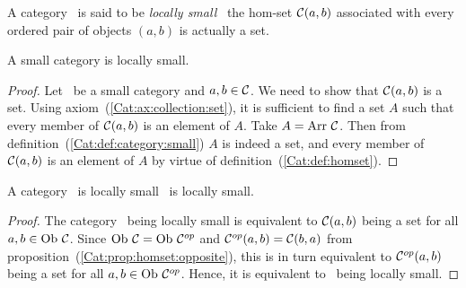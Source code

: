\begin{defin}\label{Cat:def:locally:small}
    A category \Cat\ is said to be {\em locally small} \ifand\ the hom-set
    $\mbox{$\cal C$}(a,b)$ associated with every ordered pair of objects $(a,b)$ is 
    actually a set.
\end{defin}

\begin{prop}\label{Cat:prop:small:locally:small}
    A small category is locally small.
\end{prop}
\begin{proof}
   Let \Cat\ be a small category and $a,b\in\mbox{$\cal C$}$. We need to show 
    that $\mbox{$\cal C$}(a,b)$ is a set. Using axiom~(\ref{Cat:ax:collection:set}),
    it is sufficient to find a set $A$ such that every member of
    $\mbox{$\cal C$}(a,b)$ is an element of $A$. Take $A=\mbox{\rm Arr}\ \mbox{$\cal C$}$. Then
    from definition~(\ref{Cat:def:category:small}) $A$ is indeed a set,
    and every member of $\mbox{$\cal C$}(a,b)$ is an element of $A$ by 
    virtue of definition~(\ref{Cat:def:homset}).
\end{proof}

\begin{prop}\label{Cat:prop:locally:small:opposite}
    A category \Cat\ is locally small \ifand\ \Cop is locally small.
\end{prop}
\begin{proof}
    The category \Cat\ being locally small is equivalent to $\mbox{$\cal C$}(a,b)$
    being a set for all $a,b\in\mbox{\rm Ob}\ \mbox{$\cal C$}$. Since $\mbox{\rm Ob}\ \mbox{$\cal C$}=\mbox{\rm Ob}\ \mbox{${\cal C}^{op}$}$
    and $\mbox{${\cal C}^{op}$}(a,b)=\mbox{$\cal C$}(b,a)$ from 
    proposition~(\ref{Cat:prop:homset:opposite}), this is in turn equivalent 
    to $\mbox{${\cal C}^{op}$}(a,b)$ being a set for all $a,b\in\mbox{\rm Ob}\ \mbox{${\cal C}^{op}$}$. Hence, it is
    equivalent to \Cop\ being locally small.
\end{proof}

